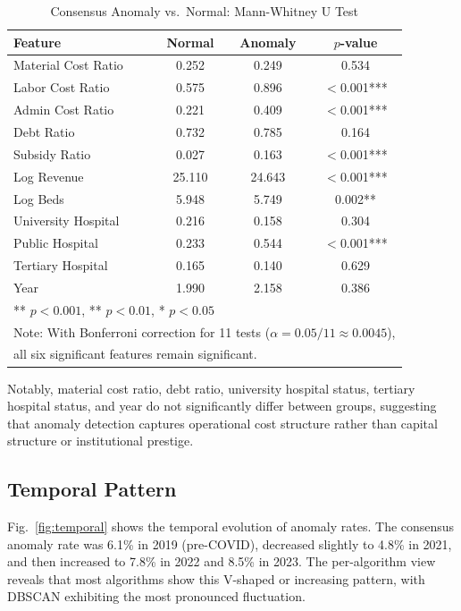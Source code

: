 \documentclass{ieeeaccess}
\begin{document}
\begin{table}[!t]
\centering
\caption{Consensus Anomaly vs.\ Normal: Mann-Whitney U Test}
\label{tab:mannwhitney}
\begin{tabular}{@{}lccc@{}}
\toprule
\textbf{Feature} & \textbf{Normal} & \textbf{Anomaly} & \textbf{$p$-value} \\
\midrule
Material Cost Ratio & 0.252 & 0.249 & 0.534 \\
Labor Cost Ratio & 0.575 & 0.896 & $<$0.001*** \\
Admin Cost Ratio & 0.221 & 0.409 & $<$0.001*** \\
Debt Ratio & 0.732 & 0.785 & 0.164 \\
Subsidy Ratio & 0.027 & 0.163 & $<$0.001*** \\
Log Revenue & 25.110 & 24.643 & $<$0.001*** \\
Log Beds & 5.948 & 5.749 & 0.002** \\
University Hospital & 0.216 & 0.158 & 0.304 \\
Public Hospital & 0.233 & 0.544 & $<$0.001*** \\
Tertiary Hospital & 0.165 & 0.140 & 0.629 \\
Year & 1.990 & 2.158 & 0.386 \\
\bottomrule
\multicolumn{4}{l}{\footnotesize *** $p < 0.001$, ** $p < 0.01$, * $p < 0.05$} \\
\multicolumn{4}{l}{\footnotesize Note: With Bonferroni correction for 11 tests ($\alpha = 0.05/11 \approx 0.0045$),} \\
\multicolumn{4}{l}{\footnotesize all six significant features remain significant.}
\end{tabular}
\end{table}

Notably, material cost ratio, debt ratio, university hospital status, tertiary hospital status, and year do not significantly differ between groups, suggesting that anomaly detection captures operational cost structure rather than capital structure or institutional prestige.

\subsection{Temporal Pattern}
\label{subsec:temporal}

Fig.~\ref{fig:temporal} shows the temporal evolution of anomaly rates. The consensus anomaly rate was 6.1\% in 2019 (pre-COVID), decreased slightly to 4.8\% in 2021, and then increased to 7.8\% in 2022 and 8.5\% in 2023. The per-algorithm view reveals that most algorithms show this V-shaped or increasing pattern, with DBSCAN exhibiting the most pronounced fluctuation.
\end{document}
